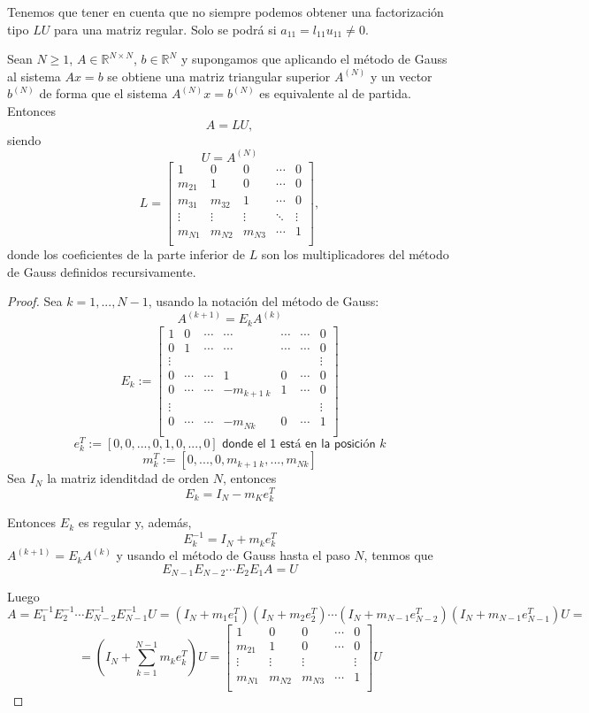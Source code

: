 Tenemos que tener en cuenta que no siempre podemos obtener una factorización tipo $LU$ para una matriz regular. Solo se podrá si $a_{11} = l_{11}u_{11} \neq 0$.

\begin{nprop}
Sean $N \geq 1$, $A \in \mathbb{R}^{N \times N}$, $b \in \mathbb{R}^N$ y supongamos que aplicando el método de Gauss al sistema $Ax = b$ se obtiene una matriz triangular superior $A^{(N)}$ y un vector $b^{(N)}$ de forma que el sistema $A^{(N)}x = b^{(N)}$ es equivalente al de partida. Entonces
\[ A = LU,\]
siendo
\[ U = A^{(N)} \]
\[ L = \begin{bmatrix}
1 & 0 & 0 & \cdots & 0 \\
m_{21} & 1 & 0 & \cdots & 0 \\
m_{31} & m_{32} & 1 & \cdots & 0 \\
\vdots &  \vdots & \vdots & \ddots & \vdots \\
m_{N1} & m_{N2} & m_{N3} & \cdots & 1 \\
\end{bmatrix}, \]
donde los coeficientes de la parte inferior de $L$ son los multiplicadores del método de Gauss definidos recursivamente.
\end{nprop}	

\begin{proof}
Sea $k=1,...,N-1$, usando la notación del método de Gauss:
\[ A^{(k+1)} = E_kA^{(k)} \]
\[ E_k := \begin{bmatrix}
1 & 0 & \cdots & \cdots & \cdots & \cdots & 0 \\
0 & 1 & \cdots & \cdots & \cdots & \cdots & 0 \\
\vdots & & & & & &  \vdots \\
0 & \cdots & \cdots & 1 & 0 & \cdots & 0 \\
0 & \cdots & \cdots & -m_{k+1 \; k} & 1 & \cdots & 0 \\
\vdots & & & & & &  \vdots \\
0 & \cdots & \cdots & -m_{Nk} & 0 & \cdots & 1 \\
\end{bmatrix}\]
\[e_k^T := \left[ 0,0,...,0,1,0,...,0 \right] \textsf{ donde el 1 está en la posición } k \]
\[ m_k^T := \left[ 0,...,0,m_{k+1 \; k},...,m_{Nk} \right] \]
Sea $I_N$ la matriz idenditdad de orden $N$, entonces
\[ E_k = I_N - m_Ke_k^T \]

Entonces $E_k$ es regular y, además, 
\[ E_k^{-1} = I_N + m_ke_k^T \]
$A^{(k+1)} = E_kA^{(k)}$ y usando el método de Gauss hasta el paso $N$, tenmos que
\[ E_{N-1}E_{N-2} \cdots E_2 E_1 A = U \]

Luego
\[ A = E_1^{-1} E_2^{-1} \cdots E_{N-2}^{-1} E_{N-1}^{-1}U
= (I_N +m_1e_1^T)(I_N+m_2e_2^T) \cdots (I_N+m_{N-1}e_{N-2}^T)(I_N+m_{N-1}e_{N-1}^T)U = \]
\[ = \left( I_N + \sum_{k=1}^{N-1} m_ke_k^T \right) U = \begin{bmatrix}
1 & 0 & 0 & \cdots & 0 \\
m_{21} & 1 & 0 & \cdots & 0 \\
\vdots & \vdots & \vdots & & \vdots \\
m_{N1} & m_{N2} & m_{N3} & \cdots & 1 \\
\end{bmatrix} U \]
\end{proof}		
			

